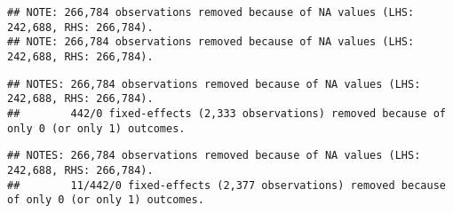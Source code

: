 \documentclass[
]{article}
\begin{document}
\begin{verbatim}
## NOTE: 266,784 observations removed because of NA values (LHS: 242,688, RHS: 266,784).
## NOTE: 266,784 observations removed because of NA values (LHS: 242,688, RHS: 266,784).
\end{verbatim}

\begin{verbatim}
## NOTES: 266,784 observations removed because of NA values (LHS: 242,688, RHS: 266,784).
##        442/0 fixed-effects (2,333 observations) removed because of only 0 (or only 1) outcomes.
\end{verbatim}

\begin{verbatim}
## NOTES: 266,784 observations removed because of NA values (LHS: 242,688, RHS: 266,784).
##        11/442/0 fixed-effects (2,377 observations) removed because of only 0 (or only 1) outcomes.
\end{verbatim}
\end{document}
